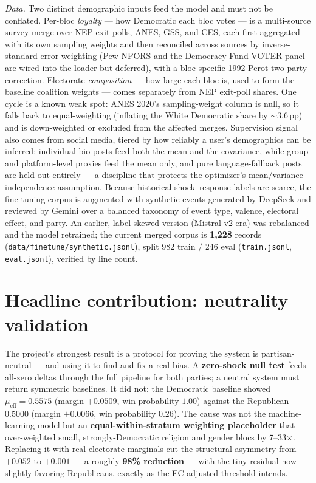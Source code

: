 \documentclass[11pt]{article}
\begin{document}
\emph{Data.} Two distinct demographic inputs feed the model and must not be
conflated. Per-bloc \emph{loyalty} --- how Democratic each bloc votes --- is a
multi-source survey merge over NEP exit polls, ANES, GSS, and CES, each first
aggregated with its own sampling weights and then reconciled across sources by
inverse-standard-error weighting (Pew NPORS and the Democracy Fund VOTER panel are
wired into the loader but deferred), with a bloc-specific 1992 Perot two-party
correction. Electorate \emph{composition} --- how large each bloc is, used to form
the baseline coalition weights --- comes separately from NEP exit-poll shares. One
cycle is a known weak spot: ANES 2020's sampling-weight column is null, so it falls
back to equal-weighting (inflating the White Democratic share by $\sim$3.6\,pp) and
is down-weighted or excluded from the affected merges. Supervision signal also comes
from social media, tiered by how reliably a user's demographics can be inferred:
individual-bio posts feed both the mean and the covariance, while group- and
platform-level proxies feed the mean only, and pure language-fallback posts are
held out entirely --- a discipline that protects the optimizer's
mean/variance-independence assumption. Because historical shock--response labels
are scarce, the fine-tuning corpus is augmented with synthetic events generated
by DeepSeek and reviewed by Gemini over a balanced taxonomy of event type,
valence, electoral effect, and party. An earlier, label-skewed version (Mistral
v2 era) was rebalanced and the model retrained; the current merged corpus is
\textbf{1{,}228} records (\texttt{data/finetune/synthetic.jsonl}), split 982
train / 246 eval (\texttt{train.jsonl}, \texttt{eval.jsonl}), verified by line
count.

\section*{Headline contribution: neutrality validation}
The project's strongest result is a protocol for proving the system is
partisan-neutral --- and using it to find and fix a real bias. A
\textbf{zero-shock null test} feeds all-zero deltas through the full pipeline for
both parties; a neutral system must return symmetric baselines. It did not: the
Democratic baseline showed $\mu_{\text{eff}}=0.5575$ (margin $+0.0509$, win
probability $1.00$) against the Republican $0.5000$ (margin $+0.0066$, win
probability $0.26$). The cause was not the machine-learning model but an
\textbf{equal-within-stratum weighting placeholder} that over-weighted small,
strongly-Democratic religion and gender blocs by 7--33$\times$. Replacing it with
real electorate marginals cut the structural asymmetry from $+0.052$ to $+0.001$
--- a roughly \textbf{98\% reduction} --- with the tiny residual now slightly
favoring Republicans, exactly as the EC-adjusted threshold intends.
\end{document}
